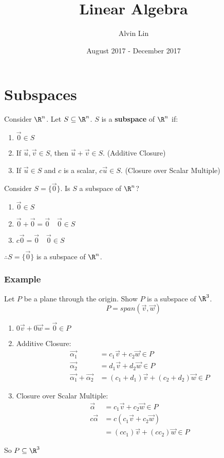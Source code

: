 \documentclass[letterpaper, 12pt]{math}
\title{Linear Algebra}
\author{Alvin Lin}
\date{August 2017 - December 2017}
\begin{document}
\maketitle

\section*{Subspaces}
Consider \( \R^n \). Let \( S\subseteq\R^n \). \( S \) is a \textbf{subspace}
of \( \R^n \) if:
\begin{enumerate}
  \item \( \vec{0}\in S \)
  \item If \( \vec{u},\vec{v}\in S \), then \( \vec{u}+\vec{v}\in S \).
  (Additive Closure)
  \item If \( \vec{u}\in S \) and \( c \) is a scalar, \( c\vec{u}\in S \).
  (Closure over Scalar Multiple)
\end{enumerate}
Consider \( S = \{\vec{0}\} \). Is \( S \) a subspace of \( \R^n \)?
\begin{enumerate}
  \item \( \vec{0}\in S \)
  \item \( \vec{0}+\vec{0} = \vec{0} \quad \vec{0}\in S \)
  \item \( c\vec{0} = \vec{0} \quad \vec{0}\in S \)
\end{enumerate}
\( \therefore S = \{\vec{0}\} \) is a subspace of \( \R^n \).

\subsubsection*{Example}
Let \( P \) be a plane through the origin. Show \( P \) is a subspace of
\( \R^3 \).
\[ P = span(\vec{v},\vec{w}) \]
\begin{enumerate}
  \item \( 0\vec{v}+0\vec{w} = \vec{0}\in P \)
  \item Additive Closure:
  \begin{align*}
    \vec{\alpha_1} &= c_1\vec{v}+c_2\vec{w}\in P \\
    \vec{\alpha_2} &= d_1\vec{v}+d_2\vec{w}\in P \\
    \vec{\alpha_1}+\vec{\alpha_2} &= (c_1+d_1)\vec{v}+(c_2+d_2)\vec{w}\in P
  \end{align*}
  \item Closure over Scalar Multiple:
  \begin{align*}
    \vec{\alpha} &= c_1\vec{v}+c_2\vec{w}\in P \\
    c\vec{\alpha} &= c(c_1\vec{v}+c_2\vec{w}) \\
    &= (cc_1)\vec{v}+(cc_2)\vec{w}\in P
  \end{align*}
\end{enumerate}
So \( P\subseteq\R^3 \)
\end{document}
